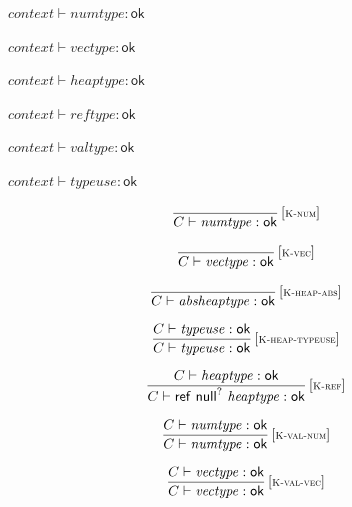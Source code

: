 \vspace{1ex}

$\boxed{{\mathit{context}} \vdash {\mathit{numtype}} : \mathsf{ok}}$

$\boxed{{\mathit{context}} \vdash {\mathit{vectype}} : \mathsf{ok}}$

$\boxed{{\mathit{context}} \vdash {\mathit{heaptype}} : \mathsf{ok}}$

$\boxed{{\mathit{context}} \vdash {\mathit{reftype}} : \mathsf{ok}}$

$\boxed{{\mathit{context}} \vdash {\mathit{valtype}} : \mathsf{ok}}$

$\boxed{{\mathit{context}} \vdash {\mathit{typeuse}} : \mathsf{ok}}$

$$
\begin{array}{@{}c@{}}\displaystyle
\frac{
}{
C \vdash {\mathit{numtype}} : \mathsf{ok}
} \, {[\textsc{\scriptsize K{-}num}]}
\qquad
\end{array}
$$

$$
\begin{array}{@{}c@{}}\displaystyle
\frac{
}{
C \vdash {\mathit{vectype}} : \mathsf{ok}
} \, {[\textsc{\scriptsize K{-}vec}]}
\qquad
\end{array}
$$

$$
\begin{array}{@{}c@{}}\displaystyle
\frac{
}{
C \vdash {\mathit{absheaptype}} : \mathsf{ok}
} \, {[\textsc{\scriptsize K{-}heap{-}abs}]}
\qquad
\end{array}
$$

$$
\begin{array}{@{}c@{}}\displaystyle
\frac{
C \vdash {\mathit{typeuse}} : \mathsf{ok}
}{
C \vdash {\mathit{typeuse}} : \mathsf{ok}
} \, {[\textsc{\scriptsize K{-}heap{-}typeuse}]}
\qquad
\end{array}
$$

$$
\begin{array}{@{}c@{}}\displaystyle
\frac{
C \vdash {\mathit{heaptype}} : \mathsf{ok}
}{
C \vdash \mathsf{ref}~{\mathsf{null}^?}~{\mathit{heaptype}} : \mathsf{ok}
} \, {[\textsc{\scriptsize K{-}ref}]}
\qquad
\end{array}
$$

$$
\begin{array}{@{}c@{}}\displaystyle
\frac{
C \vdash {\mathit{numtype}} : \mathsf{ok}
}{
C \vdash {\mathit{numtype}} : \mathsf{ok}
} \, {[\textsc{\scriptsize K{-}val{-}num}]}
\qquad
\end{array}
$$

$$
\begin{array}{@{}c@{}}\displaystyle
\frac{
C \vdash {\mathit{vectype}} : \mathsf{ok}
}{
C \vdash {\mathit{vectype}} : \mathsf{ok}
} \, {[\textsc{\scriptsize K{-}val{-}vec}]}
\qquad
\end{array}
$$

